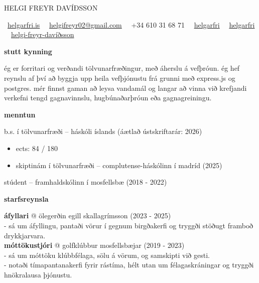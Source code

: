 \documentclass[11pt]{article}
\newcommand{\cvsection}[1]{\vspace{2em}\textbf{\large #1}\par\vspace{1em}}
\begin{document}
{\huge HELGI FREYR DAVÍÐSSON}\\
\medskip

\faGlobe\ \href{https://helgarfri.is}{helgarfri.is} \textbar\
\faEnvelope\ \href{mailto:helgifreyr02@gmail.com}{helgifreyr02@gmail.com} \textbar\
\faPhone\ +34 610 31 68 71 \textbar\
\faGithub\ \href{https://github.com/helgarfri}{helgarfri} \textbar\
\faInstagram\ \href{https://instagram.com/helgarfri}{helgarfri} \textbar\
\faLinkedin\ \href{https://www.linkedin.com/in/helgi-freyr-davíðsson-9841ba219}{helgi-freyr-davíðsson}


\cvsection{stutt kynning}
ég er forritari og verðandi tölvunarfræðingur, með áherslu á vefþróun.
ég hef reynslu af því að byggja upp heila vefþjónustu frá grunni með express.js og postgres. mér finnst gaman að leysa vandamál og langar að vinna við krefjandi verkefni tengd gagnavinnslu, hugbúnaðarþróun eða gagnagreiningu.

\cvsection{menntun}
b.s. í tölvunarfræði -- háskóli íslands \hfill (áætlað ústskriftarár: 2026)

\begin{itemize}
  \item ects: 84 / 180

  \item skiptinám í tölvunarfræði -- complutense-háskólinn í madríd \hfill (2025)

\end{itemize}



stúdent -- framhaldskólinn í mosfellsbæ \hfill (2018 - 2022)

\cvsection{starfsreynsla}
\textbf{áfyllari} @ ölegerðin egill skallagrímsson \hfill (2023 - 2025)\\
- sá um áfyllingu, pantaði vörur í gegnum birgðakerfi og tryggði stöðugt framboð drykkjarvara.\\

\textbf{móttökustjóri} @ golfklúbbur mosfellsbæjar \hfill (2019 - 2023)\\
- sá um móttöku klúbbfélaga, sölu á vörum, og samskipti við gesti. \\
- notaði tímapantanakerfi fyrir rástíma, hélt utan um félagaskráningar og tryggði hnökralausa þjónustu.
\end{document}
